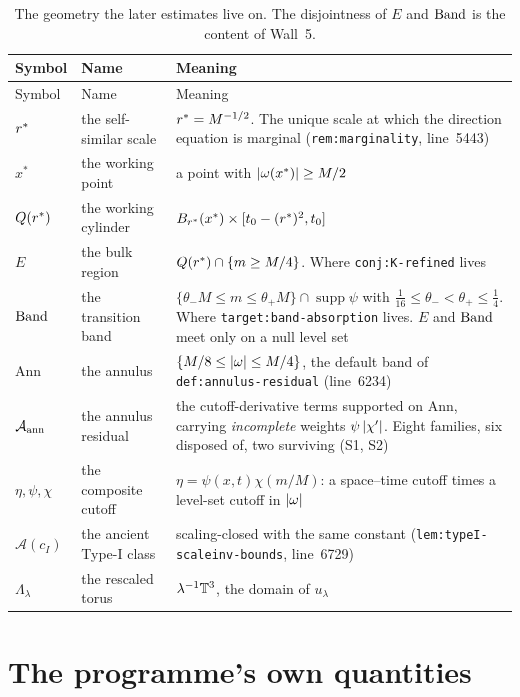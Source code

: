 {\footnotesize
\begin{longtable}{@{}l p{} p{}@{}}
\caption[Scales, regions and sets]{The geometry the later estimates live on.
The disjointness of \(E\) and \(\mathrm{Band}\) is the content of Wall~5.}
\label{tab:a3-regions}\\
\toprule
Symbol & Name & Meaning \\
\midrule
\endfirsthead
\toprule
Symbol & Name & Meaning \\
\midrule
\endhead
\bottomrule
\endfoot
\(r^{*}\) & the self-similar scale & \(r^{*}=M^{-1/2}\). The unique scale at
  which the direction equation is marginal (\texttt{rem:marginality},
  line~5443) \\
\(x^*\) & the working point & a point with \(\left|\omega(x^*)\right|\ge M/2\) \\
\(Q(r^{*})\) & the working cylinder &
  \(B_{r^{*}}(x^*)\times[t_0-(r^{*})^2,t_0]\) \\
\(E\) & the bulk region & \(Q(r^{*})\cap\{m\ge M/4\}\). Where
  \texttt{conj:K-refined} lives \\
\(\mathrm{Band}\) & the transition band &
  \(\{\theta_-M\le m\le\theta_+M\}\cap\operatorname{supp}\psi\) with
  \(\tfrac1{16}\le\theta_-<\theta_+\le\tfrac14\). Where
  \texttt{target:band-absorption} lives. \(E\) and \(\mathrm{Band}\) meet only on a
  null level set \\
\(\mathrm{Ann}\) & the annulus & \(\{M/8\le\left|\omega\right|\le M/4\}\), the default
  band of \texttt{def:annulus-residual} (line~6234) \\
\(\mathcal{A}_{\mathrm{ann}}\) & the annulus residual & the cutoff-derivative terms supported on
  \(\mathrm{Ann}\), carrying \emph{incomplete} weights \(\psi\left|\chi'\right|\).
  Eight families, six disposed of, two surviving (S1, S2) \\
\(\eta,\psi,\chi\) & the composite cutoff & \(\eta=\psi(x,t)\chi(m/M)\): a
  space--time cutoff times a level-set cutoff in \(\left|\omega\right|\) \\
\(\mathcal{A}(c_I)\) & the ancient Type-I class & scaling-closed with the same
  constant (\texttt{lem:typeI-scaleinv-bounds}, line~6729) \\
\(\Lambda_\lambda\) & the rescaled torus & \(\lambda^{-1}\mathbb{T}^3\), the domain of
  \(u_\lambda\) \\
\end{longtable}}

\section{The programme's own quantities}
\label{sec:a3-quantities}

